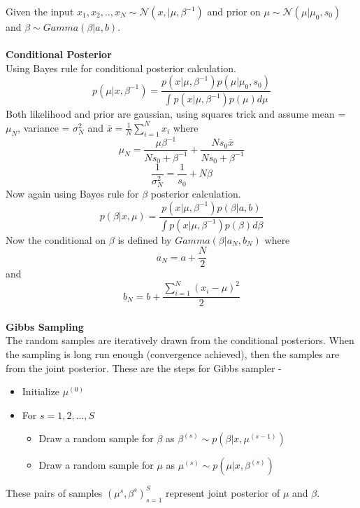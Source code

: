 \documentclass[a4paper,11pt]{article}
\begin{document}
\begin{pmisolution} 
Given the input \hspace{1em} \(x_{1}, x_{2},..,x_{N} \sim \mathcal{N}(x,|\mu,\beta^{-1})\) and prior on \(\mu \sim \mathcal{N}(\mu|\mu_{0},s_{0})\) and \(\beta \sim Gamma(\beta|a,b)\).\\\\
\textbf{Conditional Posterior}\\
Using Bayes rule for conditional posterior calculation.\\
\[p(\mu|x,\beta^{-1}) = \frac{p(x|\mu,\beta^{-1}) p(\mu|\mu_{0},s_{0})}{\int p(x|\mu,\beta^{-1})p(\mu)d\mu}\]
Both likelihood and prior are gaussian, using squares trick and assume mean = \(\mu_{N}\), variance = \( \sigma_{N}^{2}\) and \(\bar{x} = \frac{1}{N}\sum_{i=1}^{N}x_{i}\) where 
\[\mu_{N} = \frac{\mu\beta^{-1}}{Ns_{0}+\beta^{-1}} + \frac{Ns_{0}\bar{x}}{Ns_{0}+\beta^{-1}}\]
\[\frac{1}{\sigma_{N}^{2}} = \frac{1}{s_{0}} + N\beta\]
Now again using Bayes rule for \(\beta\) posterior calculation.\\
\[p(\beta|x,\mu) = \frac{p(x|\mu,\beta^{-1}) p(\beta|a,b)}{\int p(x|\mu,\beta^{-1})p(\beta)d\beta}\]
Now the conditional on \(\beta\) is defined by \(Gamma(\beta | a_{N},b_{N})\) where \\
\[a_{N} = a + \frac{N}{2}\] and \[ b_{N} = b + \frac{\sum_{i=1}^{N} (x_{i} - \mu)^{2}}{2}\]\\

\textbf{Gibbs Sampling}\\
The random samples are iteratively drawn from the conditional posteriors. When the sampling is long run enough (convergence achieved), then the samples are from the joint posterior. These are the steps for Gibbs sampler -
\begin{itemize}
    \item Initialize \(\mu^{(0)}\)
    \item For \(s = 1, 2,..., S\)
    \begin{itemize}
        \item Draw a random sample for \(\beta\) as \(\beta^{(s)} \sim p(\beta |x,\mu^{(s-1)})\)
        \item Draw a random sample for \(\mu\) as \(\mu^{(s)} \sim p(\mu |x,\beta^{(s)})\)
    \end{itemize}
\end{itemize}
These pairs of samples \((\mu^{s},\beta^{s})^{S}_{s=1}\) represent joint posterior of \(\mu\) and \(\beta\).
\end{pmisolution}
\end{document}
